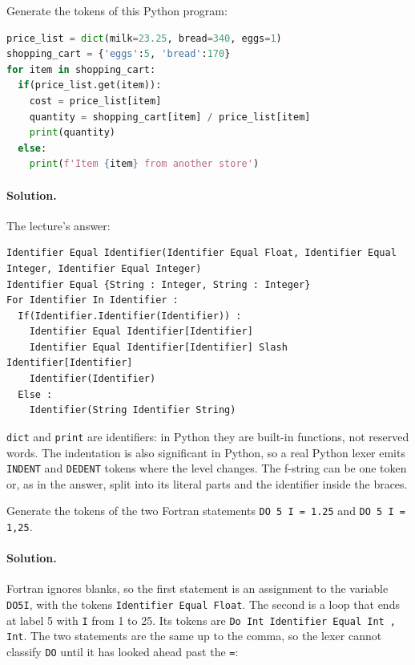 \begin{exercise}
Generate the tokens of this Python program:
\begin{lstlisting}[language=Python]
price_list = dict(milk=23.25, bread=340, eggs=1)
shopping_cart = {'eggs':5, 'bread':170}
for item in shopping_cart:
  if(price_list.get(item)):
    cost = price_list[item]
    quantity = shopping_cart[item] / price_list[item]
    print(quantity)
  else:
    print(f'Item {item} from another store')
\end{lstlisting}
\end{exercise}

\paragraph{Solution.} The lecture's answer:
\begin{lstlisting}
Identifier Equal Identifier(Identifier Equal Float, Identifier Equal Integer, Identifier Equal Integer)
Identifier Equal {String : Integer, String : Integer}
For Identifier In Identifier :
  If(Identifier.Identifier(Identifier)) :
    Identifier Equal Identifier[Identifier]
    Identifier Equal Identifier[Identifier] Slash Identifier[Identifier]
    Identifier(Identifier)
  Else :
    Identifier(String Identifier String)
\end{lstlisting}
\texttt{dict} and \texttt{print} are identifiers: in Python they are built-in
functions, not reserved words. The indentation is also significant in Python,
so a real Python lexer emits \texttt{INDENT} and \texttt{DEDENT} tokens where the
level changes. The f-string can be one token or, as in the answer, split into
its literal parts and the identifier inside the braces.

\begin{exercise}
Generate the tokens of the two Fortran statements \texttt{DO 5 I = 1.25} and
\texttt{DO 5 I = 1,25}.
\end{exercise}

\paragraph{Solution.} Fortran ignores blanks, so the first statement is an
assignment to the variable \texttt{DO5I}, with the tokens
\texttt{Identifier Equal Float}. The second is a
loop that ends at label 5 with \texttt{I} from 1 to 25. Its tokens are
\lstinline{Do Int Identifier Equal Int , Int}. The two statements are the same up
to the comma, so the lexer cannot classify \texttt{DO} until it has looked
ahead past the \texttt{=}:

